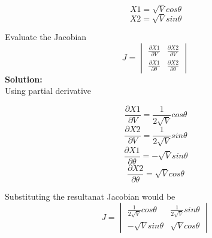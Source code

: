 \documentclass{article}
\begin{document}
$$X1 = \sqrt{V}cos\theta$$ 
$$X2 = \sqrt{V}sin\theta$$ 

Evaluate the Jacobian 
 $$J=\begin{vmatrix}
\frac{\partial X1}{\partial V} & \frac{\partial X2}{\partial V} \\
\frac{\partial X1}{\partial \theta} & \frac{\partial X2}{\partial \theta}
\end{vmatrix}$$
\textbf{Solution:} \\
Using partial derivative

$$\frac{\partial X1}{\partial V} =\frac{1}{2\sqrt{V}}cos\theta$$
$$\frac{\partial X2}{\partial V} =\frac{1}{2\sqrt{V}}sin\theta$$
$$\frac{\partial X1}{\partial \theta}=-\sqrt{V}sin\theta$$
$$\frac{\partial X2}{\partial \theta}=\sqrt{V}cos\theta$$

Substituting the resultanat Jacobian would be 
$$J=
\begin{vmatrix}
\frac{1}{2\sqrt{V}}cos\theta & \frac{1}{2\sqrt{V}}sin\theta \\
-\sqrt{V}sin\theta & \sqrt{V}cos\theta
\end{vmatrix}$$
\end{document}
